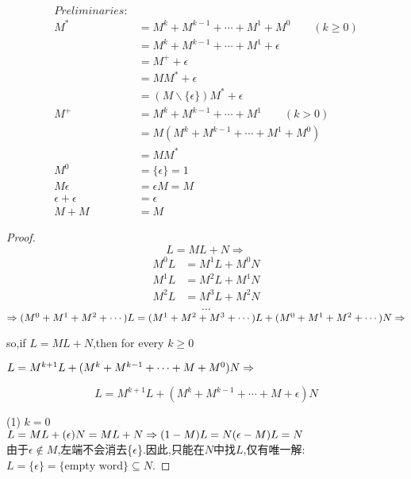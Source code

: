 \begin{solution}
	\begin{align*} Preliminaries:\\
		M^{\ast} &= M^{k} + M^{k-1} + \cdots + M^{1} + M^{0} \qquad (k\geq 0)\\
		         &= M^{k} + M^{k-1} + \cdots + M^{1} + \epsilon \\
		         &= M^{+} + \epsilon\\
		         &= MM^{*} + \epsilon\\
		         &= (M\backslash\{\epsilon\})M^{*} + \epsilon\\
		M^{+} &= M^{k} + M^{k-1} + \cdots + M^{1} \qquad (k > 0)\\
		      &= M(M^{k} + M^{k-1} + \cdots + M^{1} + M^{0}) \\
		      &= MM^{*}\\
	    M^{0} &= \{\epsilon\} = 1\\
	    M\epsilon &= \epsilon M = M\\
	    \epsilon+\epsilon &=\epsilon\\
	    M+M &= M
	\end{align*}
	\begin{proof}
		$$L = ML + N \Rightarrow$$
		\begin{align}
			M^0L &= M^1L + M^0N \\
			M^1L &= M^2L + M^1N \\
			M^2L &= M^3L + M^2N \\
		\end{align}
		$$\cdots$$
		$\Rightarrow\\ (M^0+M^1+M^2+\cdots)L = (M^1+M^2+M^3+\cdots)L + (M^0+M^1+M^2+\cdots)N \\ \Rightarrow$
	
	    so,if $L = ML +N$,then for every $k \ge 0$
	
		$L = M^{k+1}L + (M^k+M^{k-1}+\cdots+M+M^0)N \\ \Rightarrow$
		
		\begin{equation}\label{leq}
			L = M^{k+1}L + (M^k+M^{k-1}+\cdots+M+\epsilon)N
		\end{equation}
		
		(1) $k = 0$\\
		$L = ML + (\epsilon)N = ML + N \\ \Rightarrow
		(1-M)L = N \\
		(\epsilon-M)L = N$\\
		由于$\epsilon \notin M$,左端不会消去\{$\epsilon$\}.因此,只能在$N$中找$L$,仅有唯一解: $L
		=\{\epsilon\} = \text{\{empty word\}} \subseteq N$.


\end{proof}
\end{solution}
